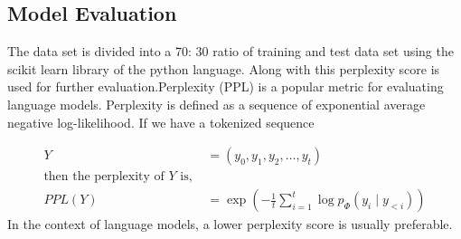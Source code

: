 \subsection{Model Evaluation}

The data set is divided into a 70: 30 ratio of training and test data set using the scikit learn library of the python language. Along with this perplexity score is used for further evaluation.Perplexity (PPL) is a popular metric for evaluating language models. \cite{BanglaGPT:1}Perplexity is defined as a sequence of exponential average negative log-likelihood. If we have a tokenized sequence

\begin{align*}
    Y      & = (y_0, y_1, y_2, \ldots, y_t)                                                \\
    \text{then the perplexity of } Y \text{ is, }                                          \\
    PPL(Y) & = \exp\left(-\frac{1}{t} \sum_{i=1}^{t} \log p_{\Phi}(y_i \mid y_{<i})\right)
\end{align*}
In the context of language models, a lower perplexity score is usually preferable.